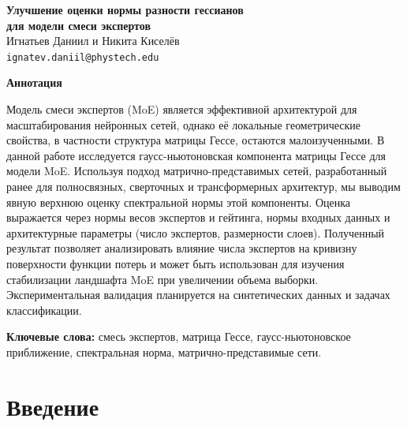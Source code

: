 \documentclass[11pt]{extarticle}
\theoremstyle{definition}
\theoremstyle{plain}
\theoremstyle{remark}
\begin{document}
\begin{center}
    \Large\textbf{Улучшение оценки нормы разности гессианов\\ для модели смеси экспертов} \\
    \vspace{0.5cm}
    \large Игнатьев Даниил и Никита Киселёв  \\
    \texttt{ignatev.daniil@phystech.edu}
\end{center}

\vspace{1cm}

\begin{center}
    \textbf{Аннотация}
\end{center}
\begin{center}
    \small
    \begin{minipage}{0.85\textwidth}
        Модель смеси экспертов (MoE) является эффективной архитектурой для масштабирования нейронных сетей, однако её локальные геометрические свойства, в частности структура матрицы Гессе, остаются малоизученными. В данной работе исследуется гаусс-ньютоновская компонента матрицы Гессе для модели MoE. Используя подход матрично-представимых сетей, разработанный ранее для полносвязных, сверточных и трансформерных архитектур, мы выводим явную верхнюю оценку спектральной нормы этой компоненты. Оценка выражается через нормы весов экспертов и гейтинга, нормы входных данных и архитектурные параметры (число экспертов, размерности слоев). Полученный результат позволяет анализировать влияние числа экспертов на кривизну поверхности функции потерь и может быть использован для изучения стабилизации ландшафта MoE при увеличении объема выборки. Экспериментальная валидация планируется на синтетических данных и задачах классификации.

        \textbf{Ключевые слова:} смесь экспертов, матрица Гессе, гаусс-ньютоновское приближение, спектральная норма, матрично-представимые сети.
    \end{minipage}
\end{center}

\vspace{1cm}

\section{Введение}
\end{document}
